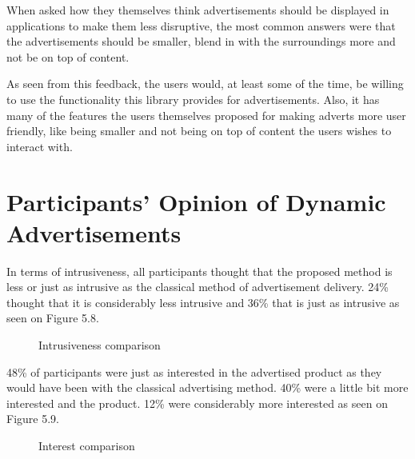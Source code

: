 When asked how they themselves think advertisements should be displayed in applications to make them less disruptive, the most common answers were that the advertisements should be smaller, blend in with the surroundings more and not be on top of content.

As seen from this feedback, the users would, at least some of the time, be willing to use the functionality this library provides for advertisements. Also, it has many of the features the users themselves proposed for making adverts more user friendly, like being smaller and not being on top of content the users wishes to interact with.

\section{Participants' Opinion of Dynamic Advertisements}

In terms of intrusiveness, all participants thought that the proposed method is less or just as intrusive as the classical method of advertisement delivery. 24\% thought that it is considerably less intrusive and 36\% that is just as intrusive as seen on Figure 5.8.

\begin{figure}
\begin{center}
\caption{Intrusiveness comparison}
\end{center}
\end{figure}

48\% of participants were just as interested in the advertised product as they would have been with the classical advertising method. 40\% were a little bit more interested and the product. 12\% were considerably more interested as seen on Figure 5.9.

\begin{figure}
\begin{center}
\caption{Interest comparison}
\end{center}
\end{figure}

